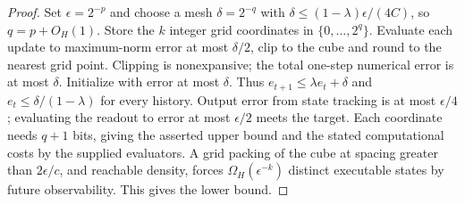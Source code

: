 \begin{proof}
Set $\epsilon=2^{-p}$ and choose a mesh $\delta=2^{-q}$ with
$\delta\le(1-\lambda)\epsilon/(4C)$, so $q=p+O_H(1)$.
Store the $k$ integer grid coordinates in $\{0,\ldots,2^q\}$.
Evaluate each update to maximum-norm error at most $\delta/2$,
clip to the cube and round to the nearest grid point. Clipping is
nonexpansive; the total one-step numerical error is at most $\delta$.
Initialize with error at most $\delta$. Thus
$e_{t+1}\le\lambda e_t+\delta$ and
$e_t\le\delta/(1-\lambda)$ for every history.
Output error from state tracking is at most $\epsilon/4$; evaluating
the readout to error at most $\epsilon/2$ meets the target.
Each coordinate needs $q+1$ bits, giving the asserted upper bound
and the stated computational costs by the supplied evaluators.
A grid packing of the cube at spacing greater than $2\epsilon/c$,
and reachable density, forces $\Omega_H(\epsilon^{-k})$ distinct
executable states by future observability. This gives the lower bound.
\end{proof}
